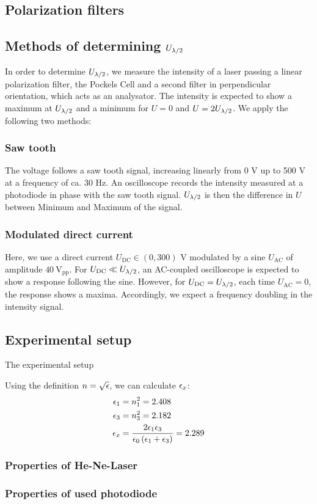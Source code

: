 \subsection{Polarization filters}

\subsection{Methods of determining $U_{\lambda/2}$}
In order to determine $U_{\lambda/2}$, we measure the intensity of a laser 
passing a linear polarization filter, the Pockels Cell and a second filter 
in perpendicular orientation, 
which acts as an analysator. The intensity is expected to show a maximum at 
$U_{\lambda/2}$ and a minimum for $U = 0$ and $U = 2U_{\lambda/2}$. We apply the following two methods:
\subsubsection{Saw tooth}
The voltage follows a saw tooth signal, increasing linearly from 0 V up to 500 V 
at a frequency of ca. 30 Hz. An oscilloscope records the intensity measured 
at a photodiode in phase with the saw tooth signal. $U_{\lambda/2}$ is then the difference 
in $U$ between Minimum and Maximum of the signal. 
\subsubsection{Modulated direct current}
Here, we use a direct current $U_\mathrm{DC} \in (0, 300)$ V modulated by a 
sine $U_\mathrm{AC}$ of amplitude $40 \ \mathrm{V_{pp}}$. 
For $U_\mathrm{DC} \ll U_{\lambda/2}$, an AC-coupled 
oscilloscope is expected to show a response following the sine. However, for 
$U_\mathrm{DC} = U_{\lambda/2}$, each time $U_\mathrm{AC} = 0$, the response shows a maxima. 
Accordingly, we expect a frequency doubling in the intensity signal. 

\subsection{Experimental setup}
The experimental setup



Using the definition $n = \sqrt{\epsilon}$, we can calculate $\epsilon_x$:
\begin{align}
    \epsilon_1 &= n_1^2 = 2.408 \\
    \epsilon_3 &= n_3^2 = 2.182 \\
    \epsilon_x &= \frac{2 \epsilon_1 \epsilon_3}{\epsilon_0 \left( \epsilon_1 + \epsilon_3\right)} = 2.289
\end{align}


\subsubsection{Properties of He-Ne-Laser}
\subsubsection{Properties of used photodiode}
